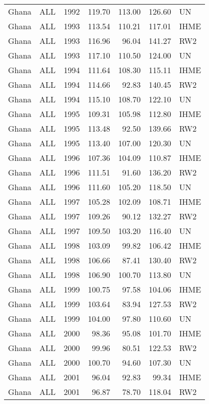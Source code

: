 \begin{longtable}{lllrrrl}
  Ghana & ALL & 1992 & 119.70 & 113.00 & 126.60 & UN \\ 
  Ghana & ALL & 1993 & 113.54 & 110.21 & 117.01 & IHME \\ 
  Ghana & ALL & 1993 & 116.96 & 96.04 & 141.27 & RW2 \\ 
  Ghana & ALL & 1993 & 117.10 & 110.50 & 124.00 & UN \\ 
  Ghana & ALL & 1994 & 111.64 & 108.30 & 115.11 & IHME \\ 
  Ghana & ALL & 1994 & 114.66 & 92.83 & 140.45 & RW2 \\ 
  Ghana & ALL & 1994 & 115.10 & 108.70 & 122.10 & UN \\ 
  Ghana & ALL & 1995 & 109.31 & 105.98 & 112.80 & IHME \\ 
  Ghana & ALL & 1995 & 113.48 & 92.50 & 139.66 & RW2 \\ 
  Ghana & ALL & 1995 & 113.40 & 107.00 & 120.30 & UN \\ 
  Ghana & ALL & 1996 & 107.36 & 104.09 & 110.87 & IHME \\ 
  Ghana & ALL & 1996 & 111.51 & 91.60 & 136.20 & RW2 \\ 
  Ghana & ALL & 1996 & 111.60 & 105.20 & 118.50 & UN \\ 
  Ghana & ALL & 1997 & 105.28 & 102.09 & 108.71 & IHME \\ 
  Ghana & ALL & 1997 & 109.26 & 90.12 & 132.27 & RW2 \\ 
  Ghana & ALL & 1997 & 109.50 & 103.20 & 116.40 & UN \\ 
  Ghana & ALL & 1998 & 103.09 & 99.82 & 106.42 & IHME \\ 
  Ghana & ALL & 1998 & 106.66 & 87.41 & 130.40 & RW2 \\ 
  Ghana & ALL & 1998 & 106.90 & 100.70 & 113.80 & UN \\ 
  Ghana & ALL & 1999 & 100.75 & 97.58 & 104.06 & IHME \\ 
  Ghana & ALL & 1999 & 103.64 & 83.94 & 127.53 & RW2 \\ 
  Ghana & ALL & 1999 & 104.00 & 97.80 & 110.60 & UN \\ 
  Ghana & ALL & 2000 & 98.36 & 95.08 & 101.70 & IHME \\ 
  Ghana & ALL & 2000 & 99.96 & 80.51 & 122.53 & RW2 \\ 
  Ghana & ALL & 2000 & 100.70 & 94.60 & 107.30 & UN \\ 
  Ghana & ALL & 2001 & 96.04 & 92.83 & 99.34 & IHME \\ 
  Ghana & ALL & 2001 & 96.87 & 78.70 & 118.04 & RW2 \\ 

\end{longtable}
